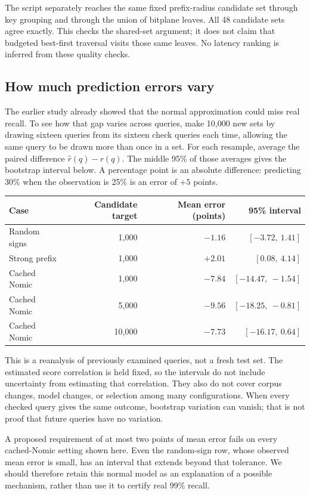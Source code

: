 The script separately reaches the same fixed prefix-radius candidate set through key grouping
and through the union of bitplane leaves. All 48 candidate sets agree exactly. This checks the
shared-set argument; it does not claim that budgeted best-first traversal visits those same
leaves. No latency ranking is inferred from these quality checks.

\subsection{How much prediction errors vary}
The earlier study already showed that the normal approximation could miss real recall.
To see how that gap varies across queries, make 10,000 new sets by drawing sixteen queries from its sixteen check queries each time,
allowing the same query to be drawn more than once in a set. For each resample, average the paired difference
$\widehat r(q)-r(q)$. The middle 95\% of those averages gives the bootstrap interval below.
A percentage point is an absolute difference: predicting 30\% when the observation is 25\%
is an error of $+5$ points.

\begin{center}\small
\begin{tabular}{@{}lrrr@{}}
\toprule
Case & Candidate target & Mean error (points) & 95\% interval\\\midrule
Random signs & 1,000 & $-1.16$ & $[-3.72,\ 1.41]$\\
Strong prefix & 1,000 & $+2.01$ & $[0.08,\ 4.14]$\\
Cached Nomic & 1,000 & $-7.84$ & $[-14.47,\ -1.54]$\\
Cached Nomic & 5,000 & $-9.56$ & $[-18.25,\ -0.81]$\\
Cached Nomic & 10,000 & $-7.73$ & $[-16.17,\ 0.64]$\\\bottomrule
\end{tabular}\normalsize
\end{center}
This is a reanalysis of previously examined queries, not a fresh test set. The estimated score
correlation is held fixed, so the intervals do not include uncertainty from estimating that
correlation. They also do not cover corpus changes, model changes, or selection among many
configurations. When every checked query gives the same outcome, bootstrap variation can
vanish; that is not proof that future queries have no variation.

A proposed requirement of at most two points of mean error fails on every cached-Nomic setting
shown here. Even the random-sign row, whose observed mean error is small, has an interval that
extends beyond that tolerance. We should therefore retain this normal model as an explanation
of a possible mechanism, rather than use it to certify real 99\% recall.

